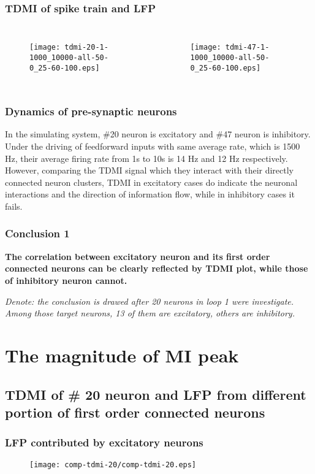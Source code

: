 \documentclass{beamer}
\begin{document}
	\begin{frame}
	\frametitle{TDMI of spike train and LFP} 
	\begin{columns}[c]
	\begin{figure}
	\centering
	\texttt{[image: tdmi-20-1-1000\_10000-all-50-0\_25-60-100.eps]}	
	\label{fig:2}
	\end{figure}		
	\begin{figure}
	\centering
	\texttt{[image: tdmi-47-1-1000\_10000-all-50-0\_25-60-100.eps]}	
	\label{fig:4}
	\end{figure}
	\end{columns}
	\end{frame}
	
	\begin{frame}
	\frametitle{Dynamics of pre-synaptic neurons}
	In the simulating system, \#20 neuron is excitatory and \#47 neuron is inhibitory. Under the driving of feedforward inputs with same average rate, which is 1500 Hz, their average firing rate from 1s to 10s is 14 Hz and 12 Hz respectively. However, comparing the TDMI signal which they interact with their directly connected neuron clusters, TDMI in excitatory cases do indicate the neuronal interactions and the direction of information flow, while in inhibitory cases it fails.
	\end{frame}
	
	\begin{frame}
	\frametitle{Conclusion 1}
	\textbf{The correlation between excitatory neuron and its first order connected neurons can be clearly reflected by TDMI plot, while those of inhibitory neuron cannot.}\par
	\emph{Denote: the conclusion is drawed after 20 neurons in loop 1 were investigate. Among those target neurons, 13 of them are excitatory, others are inhibitory.}
	\end{frame}
	\section{The magnitude of MI peak}
	\subsection{TDMI of \# 20 neuron and LFP from different portion of first order connected neurons}
	
	\begin{frame}
	\frametitle{LFP contributed by excitatory neurons}
	\begin{figure}
		\centering
		\texttt{[image: comp-tdmi-20/comp-tdmi-20.eps]}
	\end{figure}
	\end{frame}
		
\end{document}
